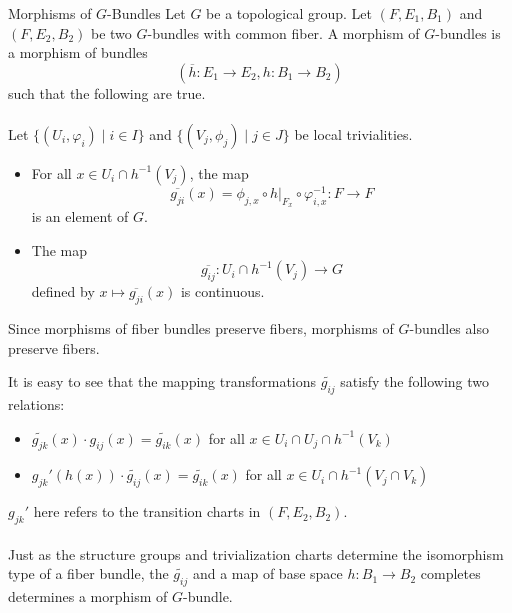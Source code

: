 \documentclass[a4paper]{article}
\begin{document}
\begin{defn}{Morphisms of $G$-Bundles}{} Let $G$ be a topological group. Let $(F,E_1,B_1)$ and $(F,E_2,B_2)$ be two $G$-bundles with common fiber. A morphism of $G$-bundles is a morphism of bundles $$(\overline{h}:E_1\to E_2,h:B_1\to B_2)$$ such that the following are true. \\~\\

Let $\{(U_i,\varphi_i)\;|\;i\in I\}$ and $\{(V_j,\phi_j)\;|\;j\in J\}$ be local trivialities. 
\begin{itemize}
\item For all $x\in U_i\cap h^{-1}(V_j)$, the map $$\overline{g_{ji}}(x)=\phi_{j,x}\circ h|_{F_x}\circ\varphi_{i,x}^{-1}:F\to F$$ is an element of $G$. 
\item The map $$\overline{g_{ij}}:U_i\cap h^{-1}(V_j)\to G$$ defined by $x\mapsto\overline{g_{ji}}(x)$ is continuous. 
\end{itemize}
\end{defn}

Since morphisms of fiber bundles preserve fibers, morphisms of $G$-bundles also preserve fibers. 

It is easy to see that the mapping transformations $\widetilde{g_{ij}}$ satisfy the following two relations: 
\begin{itemize}
\item $\widetilde{g_{jk}}(x)\cdot g_{ij}(x)=\widetilde{g_{ik}}(x)$ for all $x\in U_i\cap U_j\cap h^{-1}(V_k)$
\item $g_{jk}'(h(x))\cdot\widetilde{g_{ij}}(x)=\widetilde{g_{ik}}(x)$ for all $x\in U_i\cap h^{-1}(V_j\cap V_k)$
\end{itemize}

$g_{jk}'$ here refers to the transition charts in $(F,E_2,B_2)$. \\~\\

Just as the structure groups and trivialization charts determine the isomorphism type of a fiber bundle, the $\widetilde{g_{ij}}$ and a map of base space $h:B_1\to B_2$ completes determines a morphism of $G$-bundle. 
\end{document}
